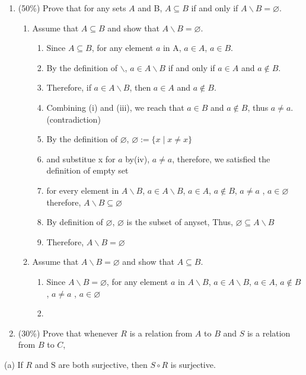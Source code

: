 \documentclass[10pt]{article}
\begin{document}
\begin{enumerate}
  \item (50\%) Prove that for any sets $A$ and B, $A \subseteq B$ if and only if $A \backslash B=\varnothing$.
    \begin{enumerate}
      \item Assume that $A \subseteq B$ and show that $A \backslash B=\varnothing$.
      \begin{enumerate}
        \item Since $A \subseteq B$, for any element $a$ in A, $a \in A$, $a \in B$.
        \item By the definition of $\backslash$, $a \in A \backslash B$ if and only if $a \in A$ and $a \notin B$.
        \item Therefore, if $a \in A \backslash B$, then $a \in A$ and $a \notin B$. 
        \item Combining (i) and (iii), we reach that $a \in B$ and $a \notin B$, thus $ a \neq a$.(contradiction)
        \item By the definition of $\varnothing$, $\varnothing:=\{x \mid x \neq x\}$
        \item and substitue x for $a$ by(iv), $a \neq a$, therefore, we satisfied the definition of empty set
        \item for every element in $A \backslash B$, $a \in A \backslash B$, $a \in A$, $a \notin B$, $a \neq a$ , $a \in \varnothing $ 
        therefore, $A \backslash B \subseteq \varnothing$
        \item By definition of $\varnothing$, $\varnothing$ is the subset of anyset, Thus, $\varnothing \subseteq A \backslash B$
        \item Therefore, $A \backslash B = \varnothing$
      \end{enumerate}
      \item Assume that $A \backslash B=\varnothing$ and show that $A \subseteq B$.
      \begin{enumerate}
        \item Since $A \backslash B=\varnothing$, for any element $a$ in $A \backslash B$, $a \in A \backslash B$, $a \in A$, $a \notin B$, $a \neq a$ , $a \in \varnothing $
        \item 
      \end{enumerate}
    \end{enumerate}
  \item (30\%) Prove that whenever $R$ is a relation from $A$ to $B$ and $S$ is a relation from $B$ to $C$,
\end{enumerate}
(a) If $R$ and $\mathrm{S}$ are both surjective, then $S \circ R$ is surjective.
\end{document}
